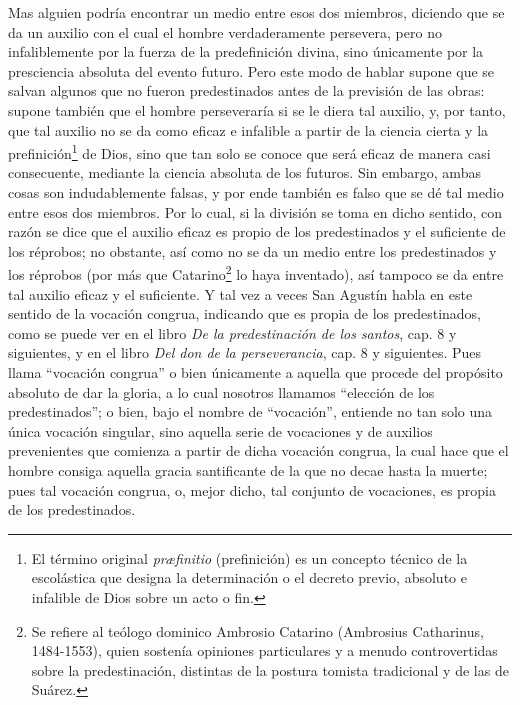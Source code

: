 \documentclass{article}
\begin{document}
Mas alguien podría encontrar un medio entre esos dos miembros, diciendo que se da un
auxilio con el cual el hombre verdaderamente persevera, pero no infaliblemente por la
fuerza de la predefinición divina, sino únicamente por la presciencia absoluta del
evento futuro. Pero este modo de hablar supone que se salvan algunos que no fueron
predestinados antes de la previsión de las obras: supone también que el hombre
perseveraría si se le diera tal auxilio, y, por tanto, que tal auxilio no se da como
eficaz e infalible a partir de la ciencia cierta y la prefinición\footnote{El término
original \textit{præfinitio} (prefinición) es un concepto técnico de la escolástica que
designa la determinación o el decreto previo, absoluto e infalible de Dios sobre un acto
o fin.} de Dios, sino que tan solo se conoce que será eficaz de manera casi consecuente,
mediante la ciencia absoluta de los futuros. Sin embargo, ambas cosas son indudablemente
falsas, y por ende también es falso que se dé tal medio entre esos dos miembros. Por lo
cual, si la división se toma en dicho sentido, con razón se dice que el auxilio eficaz
es propio de los predestinados y el suficiente de los réprobos; no obstante, así como no
se da un medio entre los predestinados y los réprobos (por más que Catarino\footnote{Se
refiere al teólogo dominico Ambrosio Catarino (Ambrosius Catharinus, 1484-1553), quien
sostenía opiniones particulares y a menudo controvertidas sobre la predestinación,
distintas de la postura tomista tradicional y de las de Suárez.} lo haya inventado), así
tampoco se da entre tal auxilio eficaz y el suficiente. Y tal vez a veces San Agustín
habla en este sentido de la vocación congrua, indicando que es propia de los
predestinados, como se puede ver en el libro \textit{De la predestinación de los
santos}, cap. 8 y siguientes, y en el libro \textit{Del don de la perseverancia}, cap. 8
y siguientes. Pues llama \enquote{vocación congrua} o bien únicamente a aquella que
procede del propósito absoluto de dar la gloria, a lo cual nosotros llamamos
\enquote{elección de los predestinados}; o bien, bajo el nombre de \enquote{vocación},
entiende no tan solo una única vocación singular, sino aquella serie de vocaciones y de
auxilios prevenientes que comienza a partir de dicha vocación congrua, la cual hace que
el hombre consiga aquella gracia santificante de la que no decae hasta la muerte; pues
tal vocación congrua, o, mejor dicho, tal conjunto de vocaciones, es propia de los
predestinados.
\end{document}
